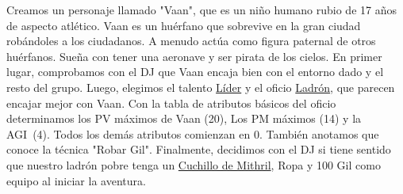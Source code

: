 \vspace{1cm}

{
Creamos un personaje llamado "Vaan", que es un niño humano rubio de 17 años de aspecto atlético. Vaan es un huérfano que sobrevive en la gran ciudad robándoles a los ciudadanos. A menudo actúa como figura paternal de otros huérfanos. Sueña con tener una aeronave y ser pirata de los cielos. En primer lugar, comprobamos con el DJ que Vaan encaja bien con el entorno dado y el resto del grupo. Luego, elegimos el talento \hyperlink{talent}{Líder} y el oficio \hyperlink{Thief}{Ladrón}, que parecen encajar mejor con Vaan. Con la tabla de atributos básicos del oficio determinamos los PV máximos de Vaan (20), Los PM máximos (14) y la AGI~(4). Todos los demás atributos comienzan en 0. También anotamos que conoce la técnica "Robar Gil". Finalmente, decidimos con el DJ si tiene sentido que nuestro ladrón pobre tenga un \hyperlink{mknife}{Cuchillo de Mithril}, Ropa y 100 Gil como equipo al iniciar la aventura.
}

\pagebreak
